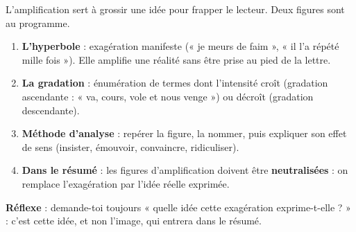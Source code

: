 \documentclass[11pt]{article}
\newcommand{\cle}[1]{{\popxbold\color{popdark}#1}}
\begin{document}
\begin{methode}
L'amplification sert à grossir une idée pour frapper le lecteur. Deux figures sont au programme.
\begin{enumerate}
\item \textbf{L'hyperbole} : exagération manifeste (« je meurs de faim », « il l'a répété mille fois »). Elle amplifie une réalité sans être prise au pied de la lettre.
\item \textbf{La gradation} : énumération de termes dont l'intensité croît (gradation ascendante : « va, cours, vole et nous venge ») ou décroît (gradation descendante).
\item \textbf{Méthode d'analyse} : repérer la figure, la nommer, puis expliquer son \cle{effet de sens} (insister, émouvoir, convaincre, ridiculiser).
\item \textbf{Dans le résumé} : les figures d'amplification doivent être \textbf{neutralisées} : on remplace l'exagération par l'idée réelle exprimée.
\end{enumerate}
\textbf{Réflexe} : demande-toi toujours « quelle idée cette exagération exprime-t-elle ? » : c'est cette idée, et non l'image, qui entrera dans le résumé.
\end{methode}
\end{document}
